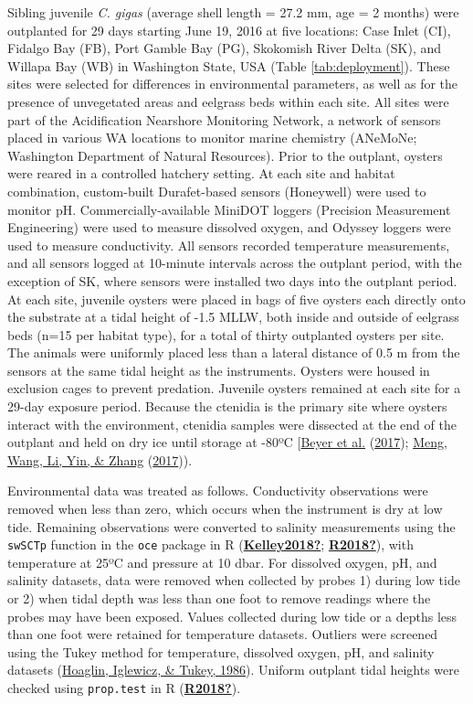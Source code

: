 \documentclass [11pt, proquest] {uwthesis}[2015/03/03]
\begin{document}
Sibling juvenile \emph{C. gigas} (average shell length = 27.2 mm, age = 2 months) were outplanted for 29 days starting June 19, 2016 at five locations: Case Inlet (CI), Fidalgo Bay (FB), Port Gamble Bay (PG), Skokomish River Delta (SK), and Willapa Bay (WB) in Washington State, USA (Table \ref{tab:deployment}). These sites were selected for differences in environmental parameters, as well as for the presence of unvegetated areas and eelgrass beds within each site. All sites were part of the Acidification Nearshore Monitoring Network, a network of sensors placed in various WA locations to monitor marine chemistry (ANeMoNe; Washington Department of Natural Resources). Prior to the outplant, oysters were reared in a controlled hatchery setting. At each site and habitat combination, custom-built Durafet-based sensors (Honeywell) were used to monitor pH. Commercially-available MiniDOT loggers (Precision Measurement Engineering) were used to measure dissolved oxygen, and Odyssey loggers were used to measure conductivity. All sensors recorded temperature measurements, and all sensors logged at 10-minute intervals across the outplant period, with the exception of SK, where sensors were installed two days into the outplant period. At each site, juvenile oysters were placed in bags of five oysters each directly onto the substrate at a tidal height of -1.5 MLLW, both inside and outside of eelgrass beds (n=15 per habitat type), for a total of thirty outplanted oysters per site. The animals were uniformly placed less than a lateral distance of 0.5 m from the sensors at the same tidal height as the instruments. Oysters were housed in exclusion cages to prevent predation. Juvenile oysters remained at each site for a 29-day exposure period. Because the ctenidia is the primary site where oysters interact with the environment, ctenidia samples were dissected at the end of the outplant and held on dry ice until storage at -80ºC {[}\protect\hyperlink{ref-Beyer2017}{Beyer et al.} (\protect\hyperlink{ref-Beyer2017}{2017}); \protect\hyperlink{ref-Meng2017}{Meng, Wang, Li, Yin, \& Zhang} (\protect\hyperlink{ref-Meng2017}{2017})).

Environmental data was treated as follows. Conductivity observations were removed when less than zero, which occurs when the instrument is dry at low tide. Remaining observations were converted to salinity measurements using the \texttt{swSCTp} function in the \texttt{oce} package in R (\protect\hyperlink{ref-Kelley2018}{\textbf{Kelley2018?}}; \protect\hyperlink{ref-R2018}{\textbf{R2018?}}), with temperature at 25ºC and pressure at 10 dbar. For dissolved oxygen, pH, and salinity datasets, data were removed when collected by probes 1) during low tide or 2) when tidal depth was less than one foot to remove readings where the probes may have been exposed. Values collected during low tide or a depths less than one foot were retained for temperature datasets. Outliers were screened using the Tukey method for temperature, dissolved oxygen, pH, and salinity datasets (\protect\hyperlink{ref-Hoaglin1986}{Hoaglin, Iglewicz, \& Tukey, 1986}). Uniform outplant tidal heights were checked using \texttt{prop.test} in R (\protect\hyperlink{ref-R2018}{\textbf{R2018?}}).
\end{document}
